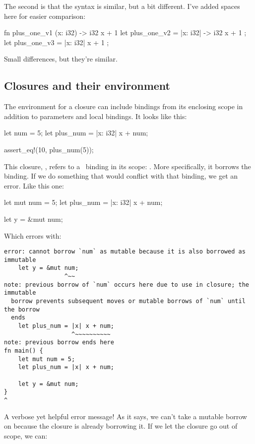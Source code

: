 The second is that the syntax is similar, but a bit different. I've added spaces here for easier comparison:

\begin{rustc}
fn  plus_one_v1   (x: i32) -> i32 { x + 1 }
let plus_one_v2 = |x: i32| -> i32 { x + 1 };
let plus_one_v3 = |x: i32|          x + 1  ;
\end{rustc}

Small differences, but they're similar.

\subsection*{Closures and their environment}

The environment for a closure can include bindings from its enclosing scope in addition to parameters and local bindings. It looks like this:

\begin{rustc}
let num = 5;
let plus_num = |x: i32| x + num;

assert_eq!(10, plus_num(5));
\end{rustc}

This closure, , refers to a \keylet\ binding in its scope: . More specifically, it borrows the binding. If we 
do something that would conflict with that binding, we get an error. Like this one:

\begin{rustc}
let mut num = 5;
let plus_num = |x: i32| x + num;

let y = &mut num;
\end{rustc}

Which errors with:

\begin{verbatim}
error: cannot borrow `num` as mutable because it is also borrowed as immutable
    let y = &mut num;
                 ^~~
note: previous borrow of `num` occurs here due to use in closure; the immutable
  borrow prevents subsequent moves or mutable borrows of `num` until the borrow
  ends
    let plus_num = |x| x + num;
                   ^~~~~~~~~~~
note: previous borrow ends here
fn main() {
    let mut num = 5;
    let plus_num = |x| x + num;

    let y = &mut num;
}
^
\end{verbatim}

A verbose yet helpful error message! As it says, we can't take a mutable borrow on  because the closure is already borrowing 
it. If we let the closure go out of scope, we can:

